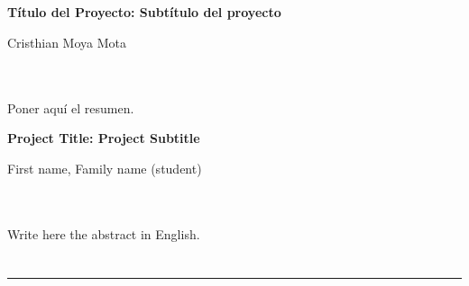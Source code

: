 \chapter*{}






\cleardoublepage
\thispagestyle{empty}

\begin{center}
{\large\bfseries Título del Proyecto: Subtítulo del proyecto}\\
\end{center}
\begin{center}
Cristhian Moya Mota\\
\end{center}

\\

\vspace{0.7cm}
\\

Poner aquí el resumen.
\cleardoublepage


\thispagestyle{empty}


\begin{center}
{\large\bfseries Project Title: Project Subtitle}\\
\end{center}
\begin{center}
First name, Family name (student)\\
\end{center}

\\

\vspace{0.7cm}
\\

Write here the abstract in English.

\chapter*{}
\thispagestyle{empty}

\noindent\rule[-1ex]{\textwidth}{2pt}\\[4.5ex]

